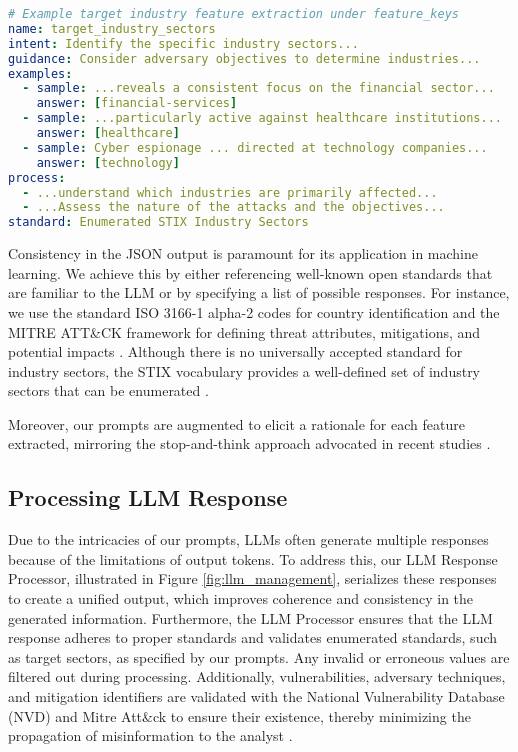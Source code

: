 \documentclass[running heads]{llncs}
\begin{document}
\begin{lstlisting}[language=yaml, caption={Excerpts from a Feature Prompt}, label=lst:feature-spec, basicstyle=\scriptsize\ttfamily]
# Example target industry feature extraction under feature_keys
name: target_industry_sectors
intent: Identify the specific industry sectors...
guidance: Consider adversary objectives to determine industries...
examples:
  - sample: ...reveals a consistent focus on the financial sector...
    answer: [financial-services]
  - sample: ...particularly active against healthcare institutions...
    answer: [healthcare]
  - sample: Cyber espionage ... directed at technology companies...
    answer: [technology]
process:
  - ...understand which industries are primarily affected...
  - ...Assess the nature of the attacks and the objectives...
standard: Enumerated STIX Industry Sectors
\end{lstlisting}

Consistency in the JSON output is paramount for its application in machine learning. We achieve this by either referencing well-known open standards that are familiar to the LLM or by specifying a list of possible responses. For instance, we use the standard ISO 3166-1 alpha-2 codes for country identification and the MITRE ATT\&CK framework for defining threat attributes, mitigations, and potential impacts \cite{mitre2023attack}. Although there is no universally accepted standard for industry sectors, the STIX vocabulary provides a well-defined set of industry sectors that can be enumerated \cite{Stix:2.1}.

Moreover, our prompts are augmented to elicit a rationale for each feature extracted, mirroring the stop-and-think approach advocated in recent studies \cite{kojima2023large}.

\subsection{Processing LLM Response} \label{processing-llm-response}
Due to the intricacies of our prompts, LLMs often generate multiple responses because of the limitations of output tokens. To address this, our LLM Response Processor, illustrated in Figure \ref{fig:llm_management}, serializes these responses to create a unified output, which improves coherence and consistency in the generated information. Furthermore, the LLM Processor ensures that the LLM response adheres to proper standards and validates enumerated standards, such as target sectors, as specified by our prompts. Any invalid or erroneous values are filtered out during processing. Additionally, vulnerabilities, adversary techniques, and mitigation identifiers are validated with the National Vulnerability Database (NVD) and Mitre Att\&ck to ensure their existence, thereby minimizing the propagation of misinformation to the analyst \cite{mitre2023attack, nvd}.
\end{document}
